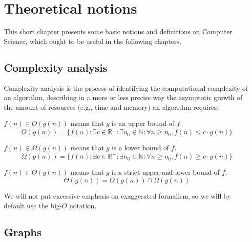 \chapter{Theoretical notions}
This short chapter presents some basic notions and definitions on Computer Science, which ought to be useful in the following chapters.
\section{Complexity analysis}
Complexity analysis is the process of identifying the computational complexity of an algorithm, describing in a more or less precise way the asymptotic growth of the amount of resources (e.g., time and memory) an algorithm requires.
\begin{definition} $f(n) \in O(g(n))$ means that $g$ is an upper bound of $f$.
    \begin{equation*}
        O(g(n))=\{f(n) : \exists c \in \mathbb{R}^+ \colon \exists n_0 \in \mathbb{N} \colon \forall n \geq n_0, f(n) \leq c\cdot g(n)\}
    \end{equation*}
\end{definition}
\begin{definition} $f(n) \in \Omega(g(n))$ means that $g$ is a lower bound of $f$.
    \begin{equation*}
        \Omega(g(n))=\{f(n) : \exists c \in \mathbb{R}^+ \colon \exists n_0 \in \mathbb{N} \colon \forall n \geq n_0, f(n) \geq c\cdot g(n)\}
    \end{equation*}
\end{definition}
\begin{definition} $f(n) \in \Theta(g(n))$ means that $g$ is a strict upper and lower bound of $f$.
    \begin{equation*}
        \Theta(g(n))=O(g(n)) \cap \Omega(g(n))
    \end{equation*}
\end{definition}
We will not put excessive emphasis on exaggerated formalism, so we will by default use the big-$O$ notation.
\section{Graphs}
